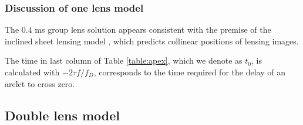 \documentclass[useAMS,usenatbib]{mn2e}
\begin{document}



\subsubsection{Discussion of one lens model}

The $0.4$ ms group lens solution appears consistent with the premise of the inclined
sheet lensing model \citep{2014MNRAS.442.3338P}, which predicts
collinear positions of lensing images.

The time in last column of Table \ref{table:apex}, which we denote as $t_0$, is calculated with $-2{\tau}f/{f_{D}}$,
corresponds to the time required for the delay of an arclet to cross zero.



\subsection{Double lens model}
\label{doublelensmodel}
\end{document}
